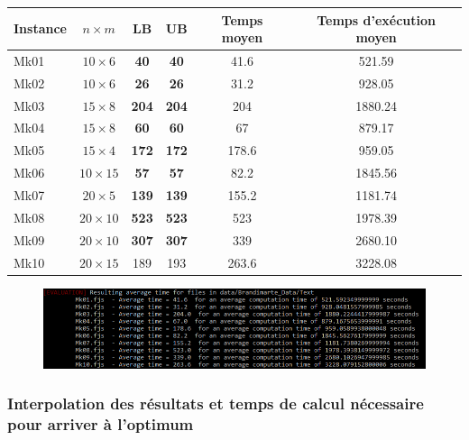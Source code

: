 \begin{table}[!h]
    \renewcommand{\arraystretch}{1.5}
    \centering
    \begin{tabular}{p{} c c c c c}
        Instance & $n \times m$ & LB & UB & Temps moyen & Temps d'exécution moyen \\
         \hline
        Mk01 & $10 \times 6$ & \textbf{40} & \textbf{40} & 41.6 & 521.59 \\
         \hline
        Mk02 & $10 \times 6$ & \textbf{26} & \textbf{26} & 31.2 & 928.05 \\
         \hline
        Mk03 & $15 \times 8$ & \textbf{204} & \textbf{204} & 204 & 1880.24 \\
         \hline
        Mk04 & $15 \times 8$ & \textbf{60} & \textbf{60} & 67 & 879.17 \\
         \hline
        Mk05 & $15 \times 4$ & \textbf{172} & \textbf{172} & 178.6 & 959.05 \\
         \hline
        Mk06 & $10 \times 15$ & \textbf{57} & \textbf{57} & 82.2 & 1845.56 \\
         \hline
        Mk07 & $20 \times 5$ & \textbf{139} & \textbf{139} & 155.2 & 1181.74 \\
         \hline
        Mk08 & $20 \times 10$ & \textbf{523} & \textbf{523} & 523 & 1978.39 \\
         \hline
        Mk09 & $20 \times 10$ & \textbf{307} & \textbf{307} & 339 & 2680.10 \\
         \hline
        Mk10 & $20 \times 15$ & 189 & 193 & 263.6 & 3228.08 \\
         \hline 
    \end{tabular}
\end{table}

\begin{figure}[!h]
    \centering
    \includegraphics[width=\linewidth]{report/Pictures/brandimarte_500_1000.png}
\end{figure}

\subsubsection{Interpolation des résultats et temps de calcul nécessaire pour arriver à l'optimum}

